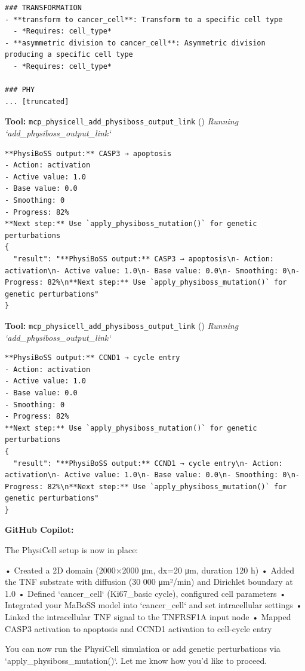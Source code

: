 \documentclass[11pt,a4paper]{article}
\begin{document}
\begin{toolokbox}
\begin{lstlisting}
### TRANSFORMATION
- **transform to cancer_cell**: Transform to a specific cell type
  - *Requires: cell_type*
- **asymmetric division to cancer_cell**: Asymmetric division producing a specific cell type
  - *Requires: cell_type*

### PHY
... [truncated]
\end{lstlisting}
\end{toolokbox}
\begin{toolokbox}
\textbf{Tool:} \texttt{mcp\_physicell\_add\_physiboss\_output\_link} (\checkmark)
\textit{Running `add\_physiboss\_output\_link`}
\begin{lstlisting}
**PhysiBoSS output:** CASP3 → apoptosis
- Action: activation
- Active value: 1.0
- Base value: 0.0
- Smoothing: 0
- Progress: 82%
**Next step:** Use `apply_physiboss_mutation()` for genetic perturbations
{
  "result": "**PhysiBoSS output:** CASP3 → apoptosis\n- Action: activation\n- Active value: 1.0\n- Base value: 0.0\n- Smoothing: 0\n- Progress: 82%\n**Next step:** Use `apply_physiboss_mutation()` for genetic perturbations"
}
\end{lstlisting}
\end{toolokbox}
\begin{toolokbox}
\textbf{Tool:} \texttt{mcp\_physicell\_add\_physiboss\_output\_link} (\checkmark)
\textit{Running `add\_physiboss\_output\_link`}
\begin{lstlisting}
**PhysiBoSS output:** CCND1 → cycle entry
- Action: activation
- Active value: 1.0
- Base value: 0.0
- Smoothing: 0
- Progress: 82%
**Next step:** Use `apply_physiboss_mutation()` for genetic perturbations
{
  "result": "**PhysiBoSS output:** CCND1 → cycle entry\n- Action: activation\n- Active value: 1.0\n- Base value: 0.0\n- Smoothing: 0\n- Progress: 82%\n**Next step:** Use `apply_physiboss_mutation()` for genetic perturbations"
}
\end{lstlisting}
\end{toolokbox}
\begin{copilotbox}
\textbf{GitHub Copilot:}

The PhysiCell setup is now in place:

• Created a 2D domain (2000×2000 μm, dx=20 μm, duration 120 h)  
• Added the TNF substrate with diffusion (30 000 μm²/min) and Dirichlet boundary at 1.0  
• Defined `cancer\_cell` (Ki67\_basic cycle), configured cell parameters  
• Integrated your MaBoSS model into `cancer\_cell` and set intracellular settings  
• Linked the intracellular TNF signal to the TNFRSF1A input node  
• Mapped CASP3 activation to apoptosis and CCND1 activation to cell-cycle entry

You can now run the PhysiCell simulation or add genetic perturbations via `apply\_physiboss\_mutation()`. Let me know how you’d like to proceed.

\end{copilotbox}
\end{document}
